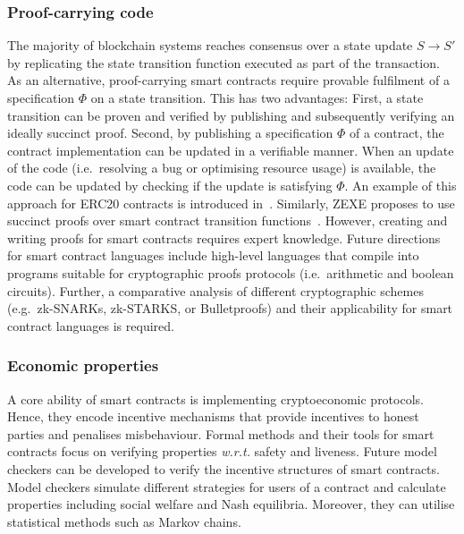 \subsubsection{Proof-carrying code}
The majority of blockchain systems reaches consensus over a state update $S \rightarrow S'$ by replicating the state transition function executed as part of the transaction. 
As an alternative, proof-carrying smart contracts require provable fulfilment of a specification $\Phi$ on a state transition. 
This has two advantages: First, a state transition can be proven and verified by publishing and subsequently verifying an ideally succinct proof. 
Second, by publishing a specification $\Phi$ of a contract, the contract implementation can be updated in a verifiable manner.
When an update of the code (i.e.\ resolving a bug or optimising resource usage) is available, the code can be updated by checking if the update is satisfying $\Phi$.
An example of this approach for ERC20 contracts is introduced in~\cite{Dickerson2018}.
Similarly, ZEXE proposes to use succinct proofs over smart contract transition functions~\cite{Bowe2018}.
However, creating and writing proofs for smart contracts requires expert knowledge.
Future directions for smart contract languages include high-level languages that compile into programs suitable for cryptographic proofs protocols (i.e.\ arithmetic and boolean circuits).
Further, a comparative analysis of different cryptographic schemes (e.g.\ zk-SNARKs, zk-STARKS, or Bulletproofs) and their applicability for smart contract languages is required.


\subsubsection{Economic properties}
A core ability of smart contracts is implementing cryptoeconomic protocols.
Hence, they encode incentive mechanisms that provide incentives to honest parties and penalises misbehaviour.
Formal methods and their tools for smart contracts focus on verifying properties \emph{w.r.t.} safety and liveness.
Future model checkers can be developed to verify the incentive structures of smart contracts.
Model checkers simulate different strategies for users of a contract and calculate properties including social welfare and Nash equilibria.
Moreover, they can utilise statistical methods such as Markov chains.



